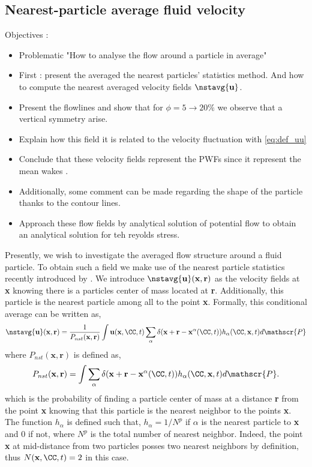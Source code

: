\subsection{Nearest-particle average fluid velocity}
Objectives : 
\begin{itemize}
    \item Problematic "How to analyse the flow around a particle in average"
    \item First : present the averaged the nearest particles' statistics method. And how to compute the nearest averaged velocity fields $\nstavg{\textbf{u}}$.
    \item Present the flowlines and show that for $\phi = 5 \rightarrow 20\%$ we observe that a vertical symmetry arise.
    \item Explain how this field it is related to the velocity fluctuation with \ref{eq:def_uu}
    \item Conclude that these velocity fields represent the PWFs since it represent the mean wakes \citep{du2022analysis}.  
    \item Additionally, some comment can be made regarding the shape of the particle thanks to the contour lines. 
    \item Approach these flow fields by analytical solution of potential flow to obtain an analytical solution for teh reyolds stress. 
\end{itemize}

Presently, we wish to investigate the  averaged flow structure around a fluid particle.
To obtain such a field we make use of the nearest particle statistics recently introduced by \citet{zhang2021stress}. 
We introduce $\nstavg{\textbf{u}}(\textbf{x},\textbf{r})$ as the velocity fields at \textbf{x} knowing there is a particles center of mass located at \textbf{r}.
Additionally, this particle is the nearest particle among all to the point \textbf{x}.  
Formally, this conditional average can be written as, 
\begin{equation}
    \nstavg{\textbf{u}}(\textbf{x},\textbf{r})=\frac{1}{P_{nst}(\textbf{x},\textbf{r})} 
    \int \textbf{u}(\textbf{x},\CC,t) 
    \sum_{\alpha}\delta(\textbf{x}+\textbf{r}-\textbf{x}^\alpha(\CC,t)) h_{\alpha}(\CC,\textbf{x},t) d\mathscr{P} 
    \label{eq:q_nst_avg}
\end{equation}
where $P_{nst}(\textbf{x},\textbf{r})$ is defined as,  
\begin{equation}
    P_{nst}(\textbf{x},\textbf{r})= 
    \int
    \sum_{\alpha}\delta(\textbf{x}+\textbf{r}-\textbf{x}^\alpha(\CC,t)) 
    h_\alpha(\CC,\textbf{x},t) d\mathscr{P}. 
    \label{eq:P_nsti}
\end{equation}
which is the probability of finding a particle center of mass at a distance \textbf{r} from the point \textbf{x} knowing that this particle is the nearest neighbor to the points \textbf{x}. 
The function $h_\alpha$ is defined such that, $h_\alpha = 1/N^p$ if $\alpha$ is the nearest particle to \textbf{x} and $0$ if not, where $N^p$ is the total number of nearest neighbor.
Indeed, the point \textbf{x} at mid-distance from two particles posses two nearest neighbors by definition, thus $N(\textbf{x},\CC,t) = 2$ in this case. 


